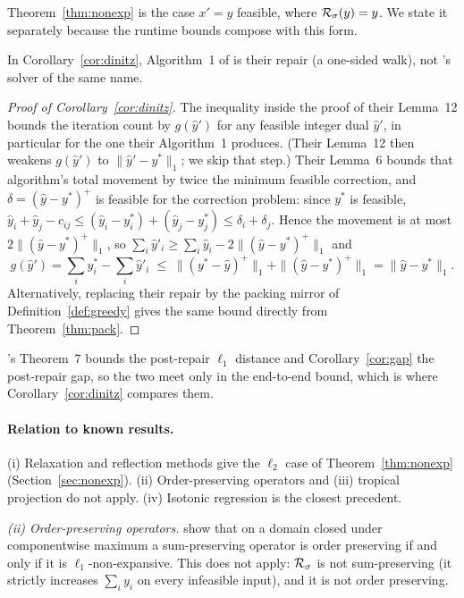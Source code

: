 Theorem~\ref{thm:nonexp} is the case $x' = y$ feasible, where $\mathcal{R}_\sigma(y) = y$. We state it
separately because the runtime bounds compose with this form.

In Corollary~\ref{cor:dinitz}, Algorithm~1 of \citeauthor{dinitz2021} is their repair (a one-sided
walk), not \citeauthor{chen2022}'s solver of the same name.

\begin{proof}[Proof of Corollary~\ref{cor:dinitz}]
The inequality inside the proof of their Lemma~12 bounds the iteration count by $g(\hat{y}')$ for
any feasible integer dual $\hat{y}'$, in particular for the one their Algorithm~1 produces. (Their
Lemma~12 then weakens $g(\hat{y}')$ to $\|\hat{y}' - y^*\|_1$; we skip that step.) Their Lemma~6
bounds that algorithm's total movement by twice the minimum feasible correction, and
$\delta = (\hat{y}-y^*)^+$ is feasible for the correction problem: since $y^*$ is feasible,
$\hat{y}_i + \hat{y}_j - c_{ij} \le (\hat{y}_i - y^*_i) + (\hat{y}_j - y^*_j) \le
\delta_i + \delta_j$. Hence the movement is at most $2\|(\hat{y}-y^*)^+\|_1$, so
$\sum_i \hat{y}'_i \ge \sum_i \hat{y}_i - 2\|(\hat{y}-y^*)^+\|_1$ and
\[
g(\hat{y}') = \sum_i y^*_i - \sum_i \hat{y}'_i
\;\le\; \|(y^*-\hat{y})^+\|_1 + \|(\hat{y}-y^*)^+\|_1 = \|\hat{y} - y^*\|_1 .
\]
Alternatively, replacing their repair by the packing mirror of Definition~\ref{def:greedy} gives the
same bound directly from Theorem~\ref{thm:pack}.
\end{proof}

\begin{remark}
\citeauthor{dinitz2021}'s Theorem~7 bounds the post-repair $\ell_1$ distance and
Corollary~\ref{cor:gap} the post-repair gap, so the two meet only in the end-to-end bound, which is
where Corollary~\ref{cor:dinitz} compares them.
\end{remark}

\paragraph{Relation to known results.}
(i) Relaxation and reflection methods give the $\ell_2$ case of Theorem~\ref{thm:nonexp} (Section~\ref{sec:nonexp}).
(ii) Order-preserving operators and (iii) tropical projection do not apply. (iv) Isotonic
regression is the closest precedent.

\emph{(ii) Order-preserving operators.} \citet{crandall1980} show that on a domain closed under
componentwise maximum a sum-preserving operator is order preserving if and only if it is
$\ell_1$-non-expansive. This does not apply: $\mathcal{R}_\sigma$ is not sum-preserving (it strictly
increases $\sum_i y_i$ on every infeasible input), and it is not order preserving.

